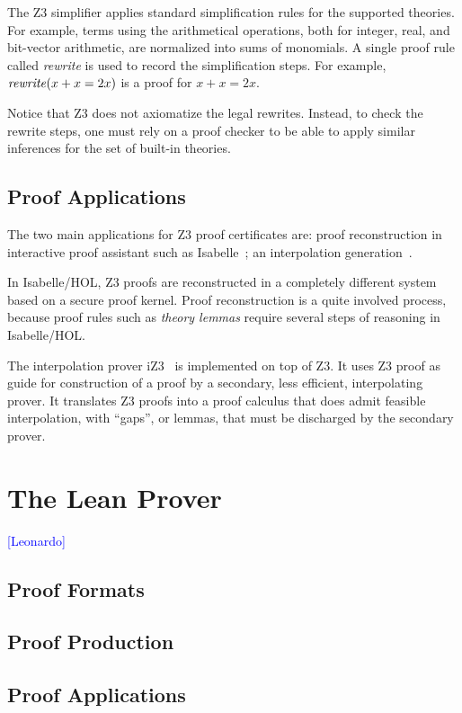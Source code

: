 \documentclass{llncs}
\newcommand{\Note}[1]{\textcolor{blue}{[#1]}}
\begin{document}
The Z3 simplifier applies standard simplification rules for the
supported theories. For example, terms using the arithmetical operations,
both for integer, real, and bit-vector arithmetic, are normalized into sums of monomials.
A single proof rule called \emph{rewrite} is used to record the simplification steps.
For example, $\mbox{\emph{rewrite}}(x + x = 2 x)$ is a proof for $x + x = 2x$.

Notice that Z3 does not axiomatize the legal rewrites.
Instead, to check the rewrite steps, one must rely on a
proof checker to be able to apply similar inferences for the set of built-in theories.

\subsection{Proof Applications}

The two main applications for Z3 proof certificates are: proof
reconstruction in interactive proof assistant such as
Isabelle~\cite{IsabelleZ3}; an interpolation generation~\cite{iZ3}.

In Isabelle/HOL, Z3 proofs are reconstructed in a completely different
system based on a secure proof kernel. Proof reconstruction is a quite
involved process, because proof rules such as \emph{theory lemmas} require
several steps of reasoning in Isabelle/HOL.

The interpolation prover iZ3~\cite{iZ3} is implemented on top of Z3.  It uses Z3
proof as guide for construction of a proof by a secondary, less
efficient, interpolating prover. It translates Z3 proofs into
a proof calculus that does admit feasible interpolation, with
``gaps'', or lemmas, that must be discharged by the secondary prover.


\section{The Lean Prover}
\Note{Leonardo}
\subsection{Proof Formats}
\subsection{Proof Production}
\subsection{Proof Applications}
\end{document}
